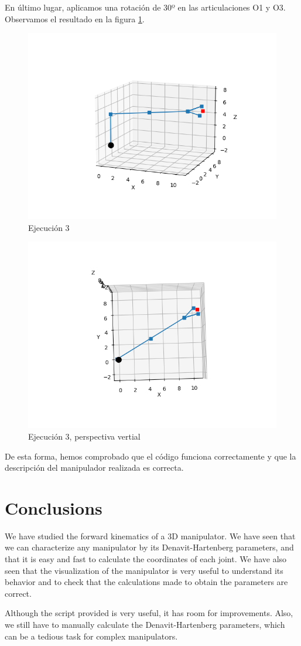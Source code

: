 En último lugar, aplicamos una rotación de 30º en las articulaciones O1 y O3. Observamos el resultado en la figura \ref{chapter:ejecucion3a}.
\begin{figure}[htb]
   \centering
   \includegraphics[width=0.8\linewidth]{images/cin_dir_7.png}
   \caption{Ejecución 3}
   \label{chapter:ejecucion3a}
\end{figure}
\begin{figure}[htb]
   \centering
   \includegraphics[width=0.8\linewidth]{images/cin_dir_8.png}
   \caption{Ejecución 3, perspectiva vertial}
   \label{chapter:ejecucion3b}
\end{figure}

De esta forma, hemos comprobado que el código funciona correctamente y que la descripción del manipulador realizada es correcta.

\section{Conclusions}
We have studied the forward kinematics of a 3D manipulator. We have seen that we can characterize any manipulator by its Denavit-Hartenberg parameters, and that it is easy and fast to calculate the coordinates of each joint. 
We have also seen that the visualization of the manipulator is very useful to understand its behavior and to check that the calculations made to obtain the parameters are correct.

\bigskip Although the script provided is very useful, it has room for improvements. Also, we still have to manually calculate the Denavit-Hartenberg parameters, which can be a tedious task for complex manipulators.